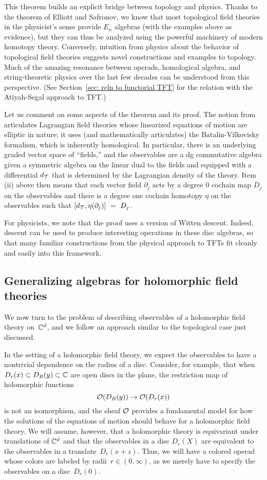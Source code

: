 \documentclass[11pt]{amsart}
\begin{document}
This theorem builds an explicit bridge between topology and physics. 
Thanks to the theorem of Elliott and Safronov, we know that most topological field theories in the physicist's sense provide $E_n$ algebras (with the examples above as evidence),
but they can thus be analyzed using the powerful machinery of modern homotopy theory. 
Conversely, intuition from physics about the behavior of topological field theories suggests novel constructions and examples to topology. 
Much of the amazing resonance between operads, homological algebra, and string-theoretic physics over the last few decades can be understood from this perspective.
(See Section~\ref{sec: reln to functorial TFT} for the relation with the Atiyah-Segal approach to TFT.)

Let us comment on some aspects of the theorem and its proof.
The notion from \cite{CosBook} articulates Lagrangian field theories whose linearized equations of motion are elliptic in nature;
it uses (and mathematically articulates) the Batalin-Vilkovisky formalism,
which is inherently homological.
In particular, there is an underlying graded vector space of ``fields,''
and the observables are a dg commutative algebra given a symmetric algebra on the linear dual to the fields and equipped with a differential $d_\mathcal T$ that is determined by the Lagrangian density of the theory.
Item (ii) above then means that each vector field $\partial_j$ acts by a degree 0 cochain map $D_j$ on the observables and there is a degree one cochain homotopy $\eta$ on the observables such that $[d_\mathcal T, \eta(\partial_j)]~=~D_j$.

For physicists, we note that the proof uses a version of Witten descent.
Indeed, descent can be used to produce interesting operations in these disc algebras,
so that many familiar constructions from the physical approach to TFTs fit cleanly and easily into this framework.

\subsection{Generalizing algebras for holomorphic field theories}

We now turn to the problem of describing observables of a holomorphic field theory on~$\mathbb C^d$,
and we follow an approach similar to the topological case just discussed.

In the setting of a holomorphic field theory, we expect the observables to have a nontrivial dependence on the radius of a disc.
Consider, for example, that 
when $D_r(x) \subset D_R(y) \subset \mathbb C$ are open discs in the plane,
the restriction map of holomorphic functions
\[
\mathcal O(D_R(y))\to \mathcal O(D_r(x))
\]
is not an isomorphism,
and the sheaf $\mathcal O$ provides a fundamental model for how the solutions of the equations of motion should behave for a holomorphic field theory.
We will assume, however, that a holomorphic theory is equivariant under translations of $\mathbb C^d$ and that the observables in a disc $D_r(X)$ are equivalent to the observables in a translate~$D_r(x+z)$.
Thus, we will have a colored operad whose colors are labeled by radii~$r \in (0,\infty)$,
as we merely have to specify the observables on a disc~$D_r(0)$.
\end{document}
